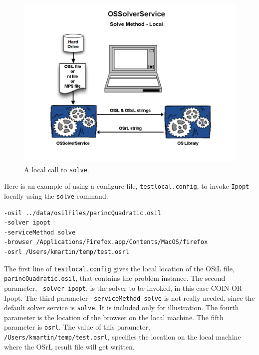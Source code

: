\documentclass[11pt]{article}
\newcommand{\figurepath}{./figures}
\newcounter{Fig}
\renewcommand{\_}{{\char"5F}}
\renewcommand{\{}{{\char"7B}}
\renewcommand{\}}{{\char"7D}}
\renewcommand{\^}{{\char"0D}}
\renewcommand{\'}{{\char"0D}}
\begin{document}
\begin{enumerate}[Step 1:]
\begin{figure}
\centering
\includegraphics[scale=0.5]{./figures/Figure9.png}
\caption{A local call to {\tt solve}.}
\label{figure:ossolverservicelocal}
\end{figure}



Here is an example of using a configure file,  {\tt testlocal.config},
to invoke {\tt Ipopt} locally using the {\tt solve} command.

\begin{verbatim}
-osil ../data/osilFiles/parincQuadratic.osil
-solver ipopt
-serviceMethod solve
-browser /Applications/Firefox.app/Contents/MacOS/firefox
-osrl /Users/kmartin/temp/test.osrl
\end{verbatim}



The first line of {\tt testlocal.config} gives the local location
of the OSiL file,
{\tt parincQuadratic.osil}, that contains the problem instance. The second parameter,
{\tt -solver ipopt},  is the solver to be invoked, in this case COIN-OR Ipopt.
The third parameter {\tt -serviceMethod solve} is not really needed, since the default solver service 
is {\tt solve}. It is included only for illustration. 
The fourth parameter is the location of the browser on the local machine. 
The fifth parameter is  {\tt osrl}. The value of this parameter, {\tt /Users/kmartin/temp/test.osrl}, 
specifies the location on the local machine where the OSrL result file will get written.



\end{enumerate}
\end{document}
